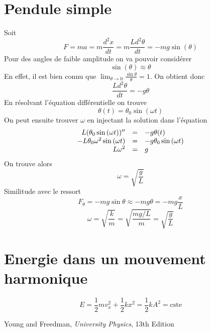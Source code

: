 \section{Pendule simple}
Soit
\[ F = ma = m\frac{d^2x}{dt} = m\frac{Ld^2\theta}{dt} = -mg\sin{(\theta )} \]
Pour des angles de faible amplitude on va pouvoir considérer
\[ \sin(\theta) \approx \theta \]
En effet, il est bien connu que $\lim_{\theta \to 0} \frac{\sin\theta}{\theta} = 1$.
On obtient donc
\[ \frac{Ld^2\theta}{dt} = -g\theta \]
En résolvant l'équation différentielle on trouve
\[ \theta{(t)} = \theta_0\sin{(\omega{t})} \]
On peut ensuite trouver $\omega$ en injectant la solution dans l'équation
\[
\begin{array}{r c l}
	L(\theta_0\sin{(\omega{t})})'' &=& -g\theta{(t)}\\
	-L\theta_0\omega^2\sin{(\omega{t})} &=& -g\theta_0\sin{(\omega{t})}\\
	L\omega^2 &=& g\\
\end{array}
\]
On trouve alors
\[ \omega = \sqrt{\frac{g}{L}} \]
Similitude avec le ressort
\[ F_{\theta} = -mg\sin\theta \approx -mg\theta = -mg\frac{x}{L} \]
\[ \omega =\sqrt{\frac{k}{m}} =\sqrt{\frac{mg/L}{m}} = \sqrt{\frac{g }{L}} \]

\section{Energie dans un mouvement harmonique}
\[ E = \frac{1}{2}mv^2_x + \frac{1}{2}kx^2 = \frac{1}{2}kA^2 = \mathrm{cste} \]

\begin{thebibliography}{9}

		Young and Freedman,
		\emph{University Physics},
		13th Edition

\end{thebibliography}


